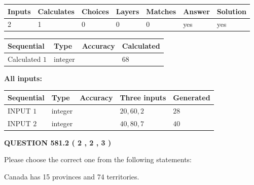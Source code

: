 \documentclass[12pt]{article}
\begin{document}
 

 
   
   
   
   
\noindent\begin{tabular}{|l|l|l|l|l|l|l|}
 \hline
Inputs & Calculates & Choices & Layers & Matches & Answer & Solution \\ \hline
 2  & 
 1  & 
 0
  & 
 0  & 
 0  & 
  yes & 
  yes 
  \\ \hline
 \end{tabular}
   
   
   
   
\noindent{}
   
   
  
  
\noindent\begin{tabular}{|l|l|l|l|}
\hline
 Sequential & Type & Accuracy & Calculated \\ 
\hline
 
 
  Calculated $  1 $ & integer &  & 
  $ 68 $ 
 \\  \hline  
 \end{tabular}
   
   
   
   
\noindent\vspace{0.1in}\hspace{-0.08in} {\textbf{\Large{All inputs: }}}
   
   
  
  
\noindent\begin{tabular}{|l|l|l|l|l|}
\hline
 Sequential & Type & Accuracy & Three inputs & Generated \\ 
\hline
 
 
  INPUT $  1 $ & integer &  & $
 20
 , 
 60
 , 
 2
 $ & $ 28 $ 
 \\  \hline  
 
 
  INPUT $  2 $ & integer &  & $
 40
 , 
 80
 , 
 7
 $ & $ 40 $ 
 \\  \hline  
 \end{tabular}
   
   
  
\vspace{0.2in}
  
{\textbf{\Large{QUESTION
581.2 
 ( 2 , 2 , 3 )
}}}
  
  
Please choose the correct one from the following statements:
 
 
Canada has  15 provinces and  74 territories.
 
\end{document}

